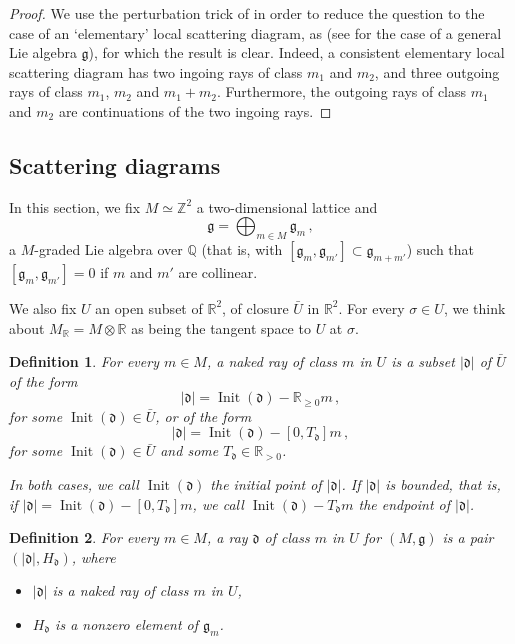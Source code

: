\documentclass[12pt, a4paper]{amsart}
\newtheorem{defn}{Definition}[section]
\newcommand\R{\mathbb R}
\newcommand\Q{\mathbb Q}
\newcommand\Z{\mathbb Z}
\newcommand\fd{\mathfrak d}
\newcommand\fg{\mathfrak g}
\newcommand\Init{\operatorname{Init}}
\begin{document}
\begin{proof}
We use the perturbation trick of 
\cite[\S 1.4]{MR2667135} in order to reduce the question to the case of an `elementary' local scattering diagram, as 
\cite[Lemma 1.9]{MR2667135} 
(see
\cite[Lemma 2.9]{mandel2015scattering}
for the case of a general Lie algebra $\fg$), for which the result is clear. Indeed, a consistent elementary local scattering diagram has two ingoing rays of class $m_1$ and $m_2$, and three outgoing rays of class $m_1$, $m_2$ and $m_1+m_2$. Furthermore, the outgoing rays of class $m_1$ and $m_2$ are continuations of the two ingoing rays.
\end{proof}




\subsection{Scattering diagrams} \label{section_scattering_definitions}


In this section, we fix
$M \simeq \Z^2$ a two-dimensional lattice
and 
\[\fg=\bigoplus_{m \in M} \fg_m \,,\] 
a $M$-graded Lie algebra over 
$\Q$ (that is, with $[\fg_{m},\fg_{m'}]\subset 
\fg_{m+m'}$) such that 
$[\fg_m,\fg_{m'}]=0$ if 
$m$ and $m'$ are collinear. 

We also fix $U$ an open subset of $\R^2$, of closure $\bar{U}$ in $\R^2$. For every $\sigma \in U$, we think about $M_\R
=M \otimes \R$ as being the tangent space to $U$ at $\sigma$.



\begin{defn} \label{def_naked_ray}
For every $m \in M$, a \emph{naked ray of class} $m$ in $U$ is a subset $|\fd|$ of $\bar{U}$
of the form \[|\fd|=\Init(\fd)-\R_{\geqslant 0} m \,,\] for some 
$\Init(\fd) \in \bar{U}$, or of the form 
\[|\fd|=\Init(\fd)-[0,T_\fd]m\,,\] 
for some 
$\Init(\fd) \in \bar{U}$ and some $T_\fd \in \R_{>0}$.

In both cases, we call $\Init(\fd)$ the initial point of $|\fd|$. If 
$|\fd|$ is bounded, that is, if 
$|\fd|=\Init(\fd)-[0,T_\fd]m$, we call 
$\Init(\fd)-T_\fd m$ the endpoint of $|\fd|$.
\end{defn}

\begin{defn} \label{def_ray}
For every $m \in M$, a \emph{ray $\fd$ of class} $m$ in $U$  for 
$(M,\fg)$ is a pair
$(|\fd|, H_\fd)$, where 
\begin{itemize}
    \item[(i)] $|\fd|$ is a naked ray of class $m$ in $U$,
    \item[(ii)] $H_\fd$ is a nonzero element of 
    $\fg_m$.
\end{itemize}
\end{defn}
\end{document}
